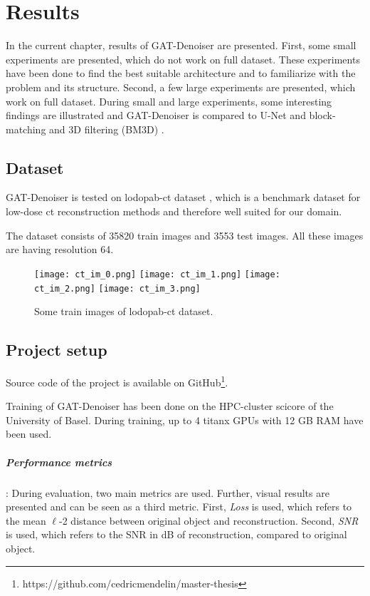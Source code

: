 \chapter{Results}
\label{sec:results}

In the current chapter, results of GAT-Denoiser are presented.
First, some small experiments are presented, which do not work on full dataset.
These experiments have been done to find the best suitable architecture and to 
familiarize with the problem and its structure.
Second, a few large experiments are presented, which work on full dataset.
During small and large experiments, some interesting findings are illustrated and GAT-Denoiser
is compared to U-Net and block-matching and 3D filtering (BM3D) \cite{bm3d}.


\section{Dataset}
GAT-Denoiser is tested on lodopab-ct dataset \cite{lodopab-dataset}, which is a 
benchmark dataset for low-dose ct reconstruction methods and therefore well suited for our domain.

The dataset consists of 35820 train images and 3553 test images.
All these images are having resolution 64.

\begin{figure}[H]
  \centering
  \hfill
  \texttt{[image: ct\_im\_0.png]}
  \hfill
  \texttt{[image: ct\_im\_1.png]}
  \hfill
  \texttt{[image: ct\_im\_2.png]}
  \hfill
  \texttt{[image: ct\_im\_3.png]}
  \hfill
  \caption{Some train images of lodopab-ct dataset.}
\end{figure}



\section{Project setup}
Source code of the project is available on GitHub\footnote{https://github.com/cedricmendelin/master-thesis}.

Training of GAT-Denoiser has been done on the HPC-cluster scicore of the University of Basel.
During training, up to 4 titanx GPUs with 12 GB RAM have been used.

\paragraph{Performance metrics}:
During evaluation, two main metrics are used. Further, visual results are presented and can be seen as a third metric.
First, \textit{Loss} is used, which refers to the mean $\ell$-2 distance between original object and reconstruction.
Second, \textit{SNR} is used, which refers to the SNR in dB of reconstruction, compared to original object.

